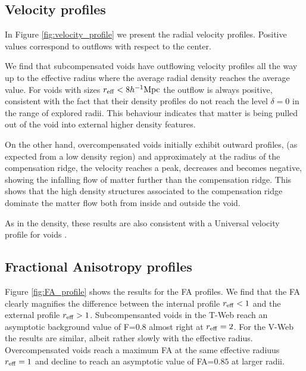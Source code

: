 \documentclass[a4,useAMS,usenatbib,usegraphicx]{mn2e}
\newcommand{\hMpc}{{\ifmmode{h^{-1}{\rm Mpc}}\else{$h^{-1}$Mpc}\fi}}
\begin{document}
\subsection{Velocity profiles}
\label{subsec:velocity_voids}

In Figure \ref{fig:velocity_profile} we present the radial velocity
profiles. 
Positive values correspond to outflows with respect to the center. 

We find that subcompensated voids have outflowing velocity profiles
all the way up to the effective radius where the average radial
density reaches the average value.
For voids with sizes $r_{\rm eff}<8\hMpc$ the outflow is always
positive, consistent with the fact that their density profiles do not
reach the level $\delta=0$ in the range of explored radii.
This behaviour indicates that matter is being pulled out of the void
into external higher density features.


On the other hand, overcompensated voids initially exhibit outward
profiles, (as expected from a low density region) and approximately at
the radius of the compensation ridge, the velocity reaches a peak,
decreases and becomes negative, showing the infalling flow of matter
further than the compensation ridge. 
This shows that the high density structures associated to the
compensation ridge dominate the matter flow both from inside and
outside the void.

As in the density, these results are also consistent with a Universal
velocity profile for voids \citep{Paz13, Hamaus14}.

\subsection{Fractional Anisotropy profiles}
\label{subsec:FA_voids}



Figure \ref{fig:FA_profile} shows the results for the FA profiles.
We find that the FA clearly magnifies the difference between the
internal profile $r_{\rm eff}<1$ and the external profile $r_{\rm
  eff}>1$. 
Subcompensanted voids in the T-Web reach an asymptotic background
value of F=$0.8$ almost right at $r_{\rm eff}=2$. 
For the V-Web the results are similar, albeit rather slowly with the
effective radius.
Overcompensated voids reach a maximum FA at the same effective radiuus
$r_{\rm eff}=1$ and decline to reach an asymptotic value of FA=$0.85$
at larger radii.
\end{document}
